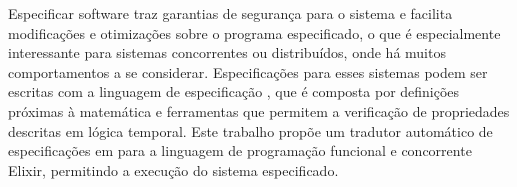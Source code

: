 Especificar software traz garantias de segurança para o sistema e facilita modificações e otimizações sobre o programa especificado, o que é especialmente interessante para sistemas concorrentes ou distribuídos, onde há muitos comportamentos a se considerar. Especificações para esses sistemas podem ser escritas com a linguagem de especificação \TLA, que é composta por definições próximas à matemática e ferramentas que permitem a verificação de propriedades descritas em lógica temporal. Este trabalho propõe um tradutor automático de especificações em \TLA para a linguagem de programação funcional e concorrente Elixir, permitindo a execução do sistema especificado.
